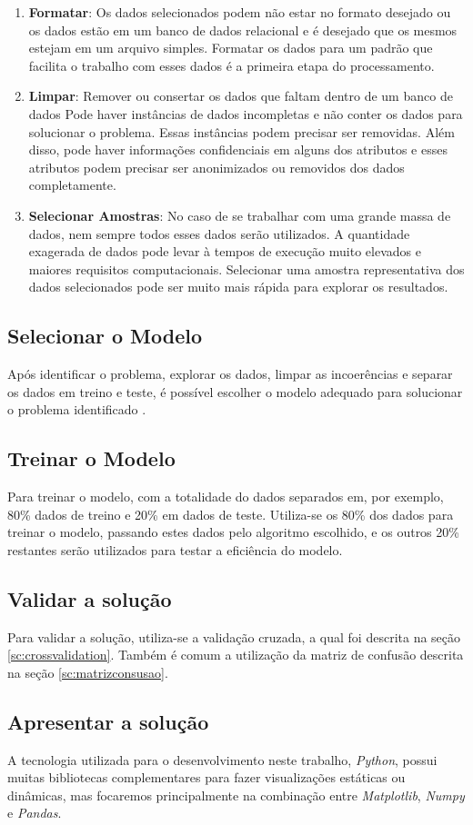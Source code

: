 \begin{enumerate}
	\item \textbf{Formatar}: Os dados selecionados podem não estar no formato desejado ou os dados estão em um banco de dados relacional e é desejado que os mesmos estejam em um arquivo simples. Formatar os dados para um padrão que facilita o trabalho com esses dados é a primeira etapa do processamento.
	\item \textbf{Limpar}: Remover ou consertar os dados que faltam dentro de um banco de dados  Pode haver instâncias de dados incompletas e não conter os dados para solucionar o problema. Essas instâncias podem precisar ser removidas. Além disso, pode haver informações confidenciais em alguns dos atributos e esses atributos podem precisar ser anonimizados ou removidos dos dados completamente.
	\item \textbf{Selecionar Amostras}: No caso de se trabalhar com uma grande massa de dados, nem sempre todos esses dados serão utilizados. A quantidade exagerada de dados pode levar à tempos de execução muito elevados e maiores requisitos computacionais. Selecionar uma amostra representativa dos dados selecionados pode ser muito mais rápida para explorar os resultados.
\end{enumerate}

\subsection{Selecionar o Modelo}
Após identificar o problema, explorar os dados, limpar as incoerências e separar os dados em treino e teste, é possível escolher o modelo adequado para solucionar o problema identificado \cite{geron2017hands}.

\subsection{Treinar o Modelo}
Para treinar o modelo, com a totalidade do dados separados em, por exemplo, 80\% dados de treino e 20\% em dados de teste. Utiliza-se os 80\% dos dados para treinar o modelo, passando estes dados pelo algoritmo escolhido, e os outros 20\% restantes serão utilizados para testar a eficiência do modelo.

\subsection{Validar a solução}
Para validar a solução, utiliza-se a validação cruzada, a qual foi descrita na seção \ref{sc:crossvalidation}. Também é comum a utilização da matriz de confusão descrita na seção \ref{sc:matrizconsusao}.

\subsection{Apresentar a solução}
A tecnologia utilizada para o desenvolvimento neste trabalho, \textit{Python}, possui muitas bibliotecas complementares para fazer visualizações estáticas ou dinâmicas, mas focaremos principalmente na combinação entre \textit{Matplotlib}, \textit{Numpy} e \textit{Pandas}.